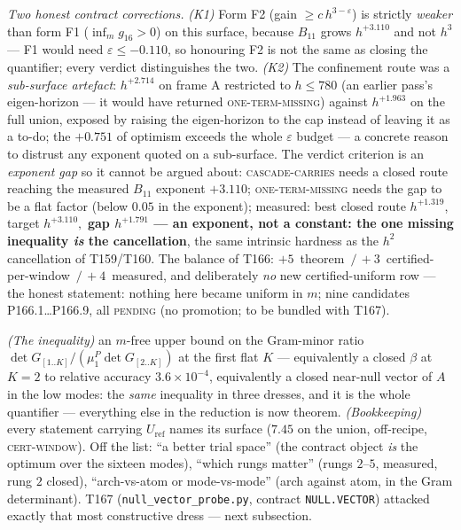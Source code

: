 \documentclass[11pt,a4paper]{article}
\begin{document}
\emph{Two honest contract corrections.} \emph{(K1)} Form F2 (gain
$\ge c\,h^{3-\varepsilon}$) is strictly \emph{weaker} than form F1
($\inf_m g_{16}>0$) on this surface, because $B_{11}$ grows $h^{+3.110}$ and
not $h^3$ --- F1 would need $\varepsilon\le-0.110$, so honouring F2 is not
the same as closing the quantifier; every verdict distinguishes the two.
\emph{(K2)} The confinement route was a \emph{sub-surface artefact}:
$h^{+2.714}$ on frame A restricted to $h\le780$ (an earlier pass's
eigen-horizon --- it would have returned \textsc{one-term-missing}) against
$h^{+1.963}$ on the full union, exposed by raising the eigen-horizon to the
cap instead of leaving it as a to-do; the $+0.751$ of optimism exceeds the
whole $\varepsilon$ budget --- a concrete reason to distrust any exponent
quoted on a sub-surface. The verdict criterion is an \emph{exponent gap} so
it cannot be argued about: \textsc{cascade-carries} needs a closed route
reaching the measured $B_{11}$ exponent $+3.110$;
\textsc{one-term-missing} needs the gap to be a flat factor (below $0.05$ in
the exponent); measured: best closed route $h^{+1.319}$, target $h^{+3.110},$
\textbf{gap $h^{+1.791}$ --- an exponent, not a constant: the one missing
inequality \emph{is} the cancellation}, the same intrinsic hardness as the
$h^2$ cancellation of T159/T160. The balance of T166: $+5$~theorem~$/\,
+3$~certified-per-window~$/\,+4$~measured, and deliberately \emph{no} new
certified-uniform row --- the honest statement: nothing here became uniform
in $m$; nine candidates P166.1\ldots P166.9, all \textsc{pending} (no
promotion; to be bundled with T167).

\begin{keybox}
\emph{(The inequality)} an $m$-free upper bound on the Gram-minor ratio
$\det G_{[1..K]}/(\mu^P_1\det G_{[2..K]})$ at the first flat $K$ ---
equivalently a closed $\beta$ at $K=2$ to relative accuracy
$3.6\times10^{-4}$, equivalently a closed near-null vector of $A$ in the low
modes: the \emph{same} inequality in three dresses, and it is the whole
quantifier --- everything else in the reduction is now theorem.
\emph{(Bookkeeping)} every statement carrying $U_{\mathrm{ref}}$ names its
surface ($7.45$ on the union, off-recipe, \textsc{cert-window}). Off the
list: ``a better trial space'' (the contract object \emph{is} the optimum
over the sixteen modes), ``which rungs matter'' (rungs $2$--$5$, measured,
rung $2$ closed), ``arch-vs-atom or mode-vs-mode'' (arch against atom, in
the Gram determinant). T167 (\texttt{null\_vector\_probe.py}, contract
\texttt{NULL.VECTOR}) attacked exactly that most constructive dress ---
next subsection.
\end{keybox}
\end{document}
